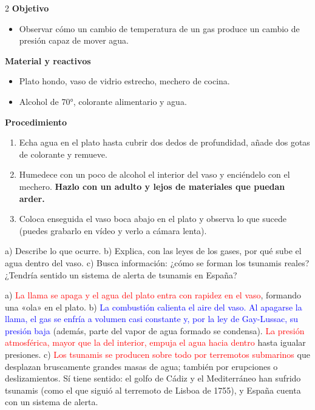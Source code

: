 \begin{multicols}{2}
    \textbf{Objetivo}
    \begin{itemize}
        \item Observar cómo un cambio de temperatura de un gas produce un cambio de presión capaz de mover agua.
    \end{itemize}
    \columnbreak
    \textbf{Material y reactivos}
    \begin{itemize}
        \item Plato hondo, vaso de vidrio estrecho, mechero de cocina.
        \item Alcohol de 70°, colorante alimentario y agua.
    \end{itemize}
\end{multicols}

\textbf{Procedimiento}
\begin{enumerate}[label=\numberballgreen]
    \item Echa agua en el plato hasta cubrir dos dedos de profundidad, añade dos gotas de colorante y remueve.
    \item Humedece con un poco de alcohol el interior del vaso y enciéndelo con el mechero. \textbf{Hazlo con un adulto y lejos de
    materiales que puedan arder.}
    \item Coloca enseguida el vaso boca abajo en el plato y observa lo que sucede (puedes grabarlo en vídeo y verlo a cámara
    lenta).
\end{enumerate}

\begin{exercise}
    a) Describe lo que ocurre. b) Explica, con las leyes de los gases, por qué sube el agua dentro del vaso.
    c) Busca información: ¿cómo se forman los tsunamis reales? ¿Tendría sentido un sistema de alerta de tsunamis en España?
    \begin{solu}
        a) \textcolor{red}{La llama se apaga y el agua del plato entra con rapidez en el vaso}, formando una «ola» en el plato.
        b) \textcolor{blue}{La combustión calienta el aire del vaso. Al apagarse la llama, el gas se enfría a volumen casi constante y,
        por la ley de Gay-Lussac, su presión baja} (además, parte del vapor de agua formado se condensa). \textcolor{red}{La presión
        atmosférica, mayor que la del interior, empuja el agua hacia dentro} hasta igualar presiones.
        c) \textcolor{red}{Los tsunamis se producen sobre todo por terremotos submarinos} que desplazan bruscamente grandes masas de agua;
        también por erupciones o deslizamientos. Sí tiene sentido: el golfo de Cádiz y el Mediterráneo han sufrido tsunamis
        (como el que siguió al terremoto de Lisboa de 1755), y España cuenta con un sistema de alerta.
    \end{solu}
\end{exercise}

